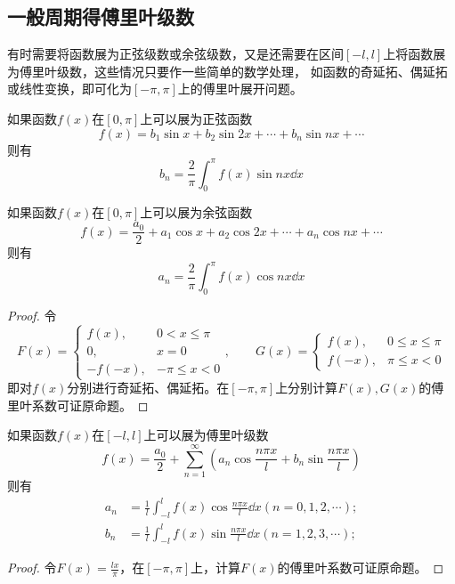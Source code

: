 \subsection{一般周期得傅里叶级数}
有时需要将函数展为正弦级数或余弦级数，又是还需要在区间$[-l,l]$上将函数展为傅里叶级数，这些情况只要作一些简单的数学处理，
如函数的奇延拓、偶延拓或线性变换，即可化为$[-\pi,\pi]$上的傅里叶展开问题。

\begin{theorem}
    如果函数$f(x)$在$[0,\pi]$上可以展为正弦函数
    \[ f(x) = b_1\sin x + b_2\sin 2x + \cdots + b_n \sin nx + \cdots \]
    则有
    \[ b_n = \frac{2}{\pi}\int_0^\pi f(x)\sin nx \dd{x} \]

    如果函数$f(x)$在$[0,\pi]$上可以展为余弦函数
    \[ f(x) = \frac{a_0}{2} + a_1\cos x + a_2\cos 2x + \cdots + a_n \cos nx + \cdots \]
    则有
    \[ a_n = \frac{2}{\pi}\int_0^\pi f(x)\cos nx \dd{x} \]
\end{theorem}
\begin{proof}
    令
    \[
        F(x) =
        \begin{cases}
            f(x),   & 0<x\leq\pi     \\
            0,      & x=0            \\
            -f(-x), & -\pi\leq x < 0
        \end{cases},
        \qquad
        G(x) =
        \begin{cases}
            f(x),  & 0\leq x \leq \pi \\
            f(-x), & \pi \leq x < 0
        \end{cases}
    \]
    即对$f(x)$分别进行奇延拓、偶延拓。在$[-\pi,\pi]$上分别计算$F(x),G(x)$的傅里叶系数可证原命题。
\end{proof}

\begin{theorem}
    如果函数$f(x)$在$[-l,l]$上可以展为傅里叶级数
    \[ f(x) = \frac{a_0}{2} + \sum_{n=1}^\infty(a_n\cos \frac{n\pi x}{l} + b_n\sin\frac{n\pi x}{l}) \]
    则有
    \begin{align*}
        a_n & = \frac{1}{l}\int_{-l}^l f(x)\cos\frac{n\pi x}{l}\dd{x} (n=0,1,2,\cdots); \\
        b_n & = \frac{1}{l}\int_{-l}^l f(x)\sin\frac{n\pi x}{l}\dd{x} (n=1,2,3,\cdots);
    \end{align*}
\end{theorem}
\begin{proof}
    令$F(x)=\frac{lx}{\pi}$，在$[-\pi,\pi]$上，计算$F(x)$的傅里叶系数可证原命题。
\end{proof}